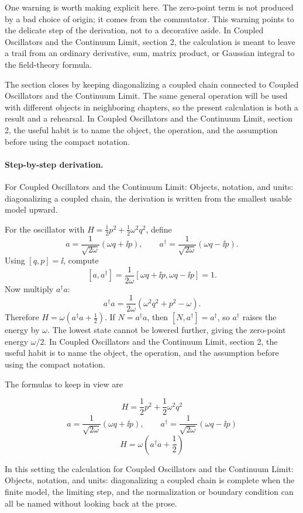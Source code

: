 One warning is worth making explicit here.  The zero-point term is not produced by a bad choice of origin; it comes from the commutator.  This warning points to the delicate step of the derivation, not to a decorative aside.  In Coupled Oscillators and the Continuum Limit, section 2, the calculation is meant to leave a trail from an ordinary derivative, sum, matrix product, or Gaussian integral to the field-theory formula.

The section closes by keeping diagonalizing a coupled chain connected to Coupled Oscillators and the Continuum Limit.  The same general operation will be used with different objects in neighboring chapters, so the present calculation is both a result and a rehearsal.  In Coupled Oscillators and the Continuum Limit, section 2, the useful habit is to name the object, the operation, and the assumption before using the compact notation.



\paragraph{Step-by-step derivation.}

For Coupled Oscillators and the Continuum Limit: Objects, notation, and units: diagonalizing a coupled chain, the derivation is written from the smallest usable model upward.

For the oscillator with \(H=\frac12p^2+\frac12\omega^2q^2\), define
\[
  a=\frac{1}{\sqrt{2\omega}}(\omega q+\ii p),\qquad
  a^\dagger=\frac{1}{\sqrt{2\omega}}(\omega q-\ii p).
\]
Using \([q,p]=\ii\), compute
\[
  [a,a^\dagger]
  =
  \frac{1}{2\omega}[\omega q+\ii p,\omega q-\ii p]=1.
\]
Now multiply \(a^\dagger a\):
\[
  a^\dagger a=\frac{1}{2\omega}(\omega^2q^2+p^2-\omega).
\]
Therefore \(H=\omega(a^\dagger a+\frac12)\).  If \(N=a^\dagger a\), then \([N,a^\dagger]=a^\dagger\), so \(a^\dagger\) raises the energy by \(\omega\).  The lowest state cannot be lowered further, giving the zero-point energy \(\omega/2\).  In Coupled Oscillators and the Continuum Limit, section 2, the useful habit is to name the object, the operation, and the assumption before using the compact notation.

The formulas to keep in view are

\[
  H=\frac12p^2+\frac12\omega^2q^2
\]
\[
  a=\frac{1}{\sqrt{2\omega}}(\omega q+\ii p),\qquad a^\dagger=\frac{1}{\sqrt{2\omega}}(\omega q-\ii p)
\]
\[
  H=\omega\left(a^\dagger a+\frac12\right)
\]

In this setting the calculation for Coupled Oscillators and the Continuum Limit: Objects, notation, and units: diagonalizing a coupled chain is complete when the finite model, the limiting step, and the normalization or boundary condition can all be named without looking back at the prose.




